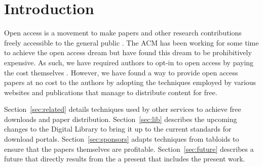 \section{Introduction}
Open access is a movement to make papers and other research contributions
freely accessible to the general public \cite{oa}.
The ACM has been working for some time to achieve the open access dream but
have found this dream to be prohibitively expensive.
As such, we have required authors to opt-in to open access by paying the cost
themselves \cite{auth}.
However, we have found a way to provide open access papers at no cost to the
authors by adopting the techniques employed by various websites and
publications that manage to distribute content for free.

Section~\ref{sec:related} details techniques used by other services to achieve
free downloads and paper distribution.
Section~\ref{sec:lib} describes the upcoming changes to the Digital Library to
bring it up to the current standards for download portals.
Section~\ref{sec:sponsors} adapts techniques from tabloids to ensure that
the papers themselves are profitable.
Section~\ref{sec:future} describes a future that directly results from the
a present that includes the present work.
